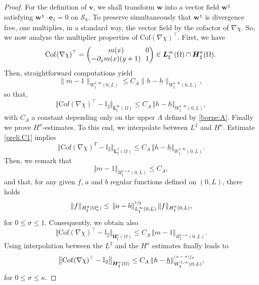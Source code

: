 \documentclass[10pt]{amsart}
\let\mathcal\mathscr
\newcommand{\psfrac}[2]{\sfrac{(#1)}{#2}}
\theoremstyle{remark}
\theoremstyle{definition}
\newcommand{\norme}[1]{\,\Vert #1\Vert}
\newcommand{\bnorme}[1]{\,\bigl\Vert #1\bigr\Vert}
\newcommand{\vg}{\boldsymbol{v}}
\newcommand{\wg}{\boldsymbol{w}}
\newcommand{\BS}[1]{\boldsymbol{#1}}
\let\CM\Omega
\newcommand{\hb}{{\underline{h}}}
\newcommand{\Cof}{\mathrm{Cof}}
\begin{document}
\begin{proof}
For the definition of $\vg$, we shall transform $\wg$ into a vector field $\wg^{\chi}$ satisfying $\wg^{\chi} \cdot \BS{e}_1 = 0$ on $\mathcal S_{\hb}$. To preserve simultaneously that $\wg^{\chi}$ is divergence free, one multiplies, in a standard way, the vector field by the cofactor of $\nabla \chi$. So, we now analyze the multiplier properties of $\Cof(\nabla\chi)^{\top}$. First, we have
\[\arraycolsep3.5pt
\Cof(\nabla\chi)^{\top} = \begin{pmatrix}
m(x)&0\\
-\partial_x m(x)(y+1)&1\\
\end{pmatrix} \in \BS{L}^\infty_\sharp(\Omega)\cap \BS{H}_\sharp^\kappa(\Omega).
\]
Then, straightforward computations yield
\begin{equation} \label{prelim.h}
\|m-1\|_{W^{1,\infty}_{\sharp}(0,L)} \leq C_A \|h-\underline{h}\|_{W^{1,\infty}_{\sharp}(0,L)},
\end{equation}
so that,
\begin{equation}\label{preli.C1}
\norme{\Cof(\nabla\chi)^{\top}-\mathbb I_2}_{\BS{L}^{\infty}_{\sharp}(\CM)}\leq C_A\norme{h-\hb}_{W^{1,\infty}_{\sharp}(0,L)},
\end{equation}
with $C_A$ a constant depending only on the upper $A$ defined by \eqref{borne:A}.
Finally we prove $H^{\sigma}$-estimates.
To this end, we interpolate between $L^2$ and $H^\kappa$. Estimate \eqref{preli.C1} implies
\[
\norme{\Cof(\nabla\chi)^{T}-\mathbb I_2}_{\BS{L}^{2}_{\sharp}(\CM)}\leq C_A\norme{h-\hb}_{W^{1,\infty}_{\sharp}(0,L)}.
\]
Then, we remark that
\[
\norme{m-1}_{H^{1+\kappa}_{\sharp}(0,L)}\leq C_{A},
\]
and that, for any given $f$, $a$ and $b$ regular functions defined on $(0,L)$, there holds
\begin{equation}\label{2D.1D.estimate}\norme{f}_{H_\sharp^{\sigma}(\Omega_{a}^{b})}\leq \norme{a-b}_{L_\sharp^{\infty}(0,L)}^{\sfrac{1}{2}}\norme{f}_{H_\sharp^{\sigma}(0,L)},
\end{equation}
for $0\leq \sigma\leq 1$. Consequently, we obtain also
\[\bnorme{\Cof(\nabla\chi)^{\top}-\mathbb I_2}_{\BS{H}^{\kappa}_{\sharp}(\CM)}\leq C_A\norme{m-1}_{H^{1+\kappa}_{\sharp}(0,L)}.
\]
Using interpolation between the $L^{2}$ and the $H^{\kappa}$ estimates finally leads to
\begin{equation}\label{preli.Hs}\bnorme{\Cof(\nabla\chi)^{\top}-\mathbb I_2}_{\BS{H}^{\sigma}_{\sharp}(\CM)}\leq C_A \norme{h-\hb}_{W^{1,\infty}_{\sharp}(0,L)}^{\psfrac{\kappa-\sigma}{\kappa}},
\end{equation}
for $0\leq \sigma\leq \kappa$.


\end{proof}
\end{document}
